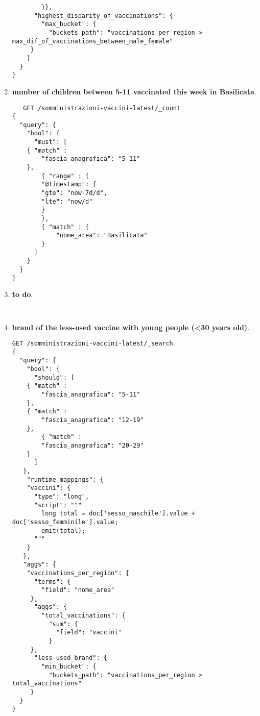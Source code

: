 \documentclass{article}
\begin{document}
\begin{enumerate}
\begin{lstlisting}
        }},
      "highest_disparity_of_vaccinations": {
        "max_bucket": {
          "buckets_path": "vaccinations_per_region > max_dif_of_vaccinations_between_male_female" 
     }
    }
  }
}
\end{lstlisting}
\item \textbf{number of children between 5-11 vaccinated this week in Basilicata}.\\
\begin{lstlisting}
   GET /somministrazioni-vaccini-latest/_count
{
  "query": {
    "bool": {
      "must": [
	{ "match" : 
	    "fascia_anagrafica": "5-11" 
	},
        { "range" : {
	    "@timestamp": {
		"gte": "now-7d/d",
		"lte": "now/d"
	    }
        },
        { "match" : {
            "nome_area": "Basilicata"
        }
      ]
    }
  }
}
\end{lstlisting}
\item \textbf{to do}.\\
\begin{lstlisting}
   
\end{lstlisting}
\item \textbf{brand of the less-used vaccine with young people (<30 years old)}.\\
\begin{lstlisting}
GET /somministrazioni-vaccini-latest/_search
{
  "query": {
    "bool": {
      "should": [
	{ "match" : 
	    "fascia_anagrafica": "5-11" 
	},
	{ "match" : 
	    "fascia_anagrafica": "12-19" 
	},
        { "match" : 
	    "fascia_anagrafica": "20-29" 
	}
      ]
   },
    "runtime_mappings": {
    "vaccini": {
      "type": "long",
      "script": """
        long total = doc['sesso_maschile'].value + doc['sesso_femminile'].value;
        emit(total);
      """
    }
   },
   "aggs": {
    "vaccinations_per_region": {
      "terms": {
        "field": "nome_area"
     },
      "aggs": {
        "total_vaccinations": {
          "sum": {
            "field": "vaccini"
          }
     },
      "less-used_brand": {
        "min_bucket": {
          "buckets_path": "vaccinations_per_region > total_vaccinations" 
     }
  }
}
\end{lstlisting}
\end{enumerate}
\end{document}

